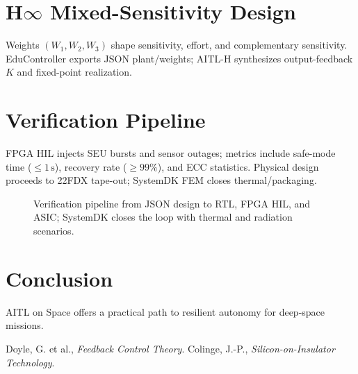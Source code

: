 \documentclass[conference]{IEEEtran}
\begin{document}
\section{H$\infty$ Mixed-Sensitivity Design}
Weights $(W_1,W_2,W_3)$ shape sensitivity, effort, and complementary sensitivity. EduController exports JSON plant/weights; AITL-H synthesizes output-feedback $K$ and fixed-point realization.

\section{Verification Pipeline}
FPGA HIL injects SEU bursts and sensor outages; metrics include safe-mode time ($\leq 1\,\mathrm{s}$), recovery rate ($\geq 99\%$), and ECC statistics. Physical design proceeds to 22FDX tape-out; SystemDK FEM closes thermal/packaging.

\begin{figure}[t]
  \centering
  \caption{Verification pipeline from JSON design to RTL, FPGA HIL, and ASIC; SystemDK closes the loop with thermal and radiation scenarios.}
  \label{fig:pipeline}
\end{figure}

\section{Conclusion}
AITL on Space offers a practical path to resilient autonomy for deep-space missions.


\begin{thebibliography}{9}
 Doyle, G. et al., \emph{Feedback Control Theory}.
 Colinge, J.-P., \emph{Silicon-on-Insulator Technology}.
\end{thebibliography}
\end{document}
